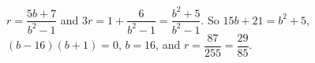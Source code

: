 $r=\dfrac{5b+7}{b^2-1}$ and $3r=1+\dfrac6{b^2-1}=\dfrac{b^2+5}{b^2-1}$. So $15b+21=b^2+5$, $(b-16)(b+1)=0$, $b=16$, and $r=\dfrac{87}{255}=\boxed{\dfrac{29}{85}}$.
